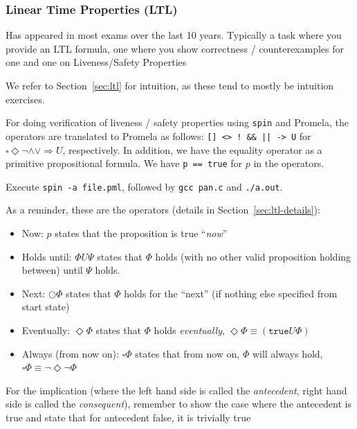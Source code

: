 \newpage
\subsubsection{Linear Time Properties (LTL)}
\begin{examdetails}
    Has appeared in most exams over the last 10 years.
    Typically a task where you provide an LTL formula, one where you show correctness / counterexamples for one and one on Liveness/Safety Properties
\end{examdetails}
We refer to Section~\ref{sec:ltl} for intuition, as these tend to mostly be intuition exercises.

For doing verification of liveness / safety properties using \texttt{spin} and Promela,
the operators are translated to Promela as follows:
\verb+[] <> ! && || -> U+ for $\square \Diamond \neg \land \lor \Rightarrow U$, respectively.
In addition, we have the equality operator as a primitive propositional formula. We have \texttt{p == true} for $p$ in the operators.

Execute \texttt{spin -a file.pml}, followed by \texttt{gcc pan.c} and \texttt{./a.out}.

As a reminder, these are the operators (details in Section~\ref{sec:ltl-details}):
\begin{itemize}
    \item Now: $p$ states that the proposition is true ``\textit{now}''
    \item Holds until: $\Phi U \Psi$ states that $\Phi$ holds (with no other valid proposition holding between) until $\Psi$ holds.
    \item Next: $\bigcirc \Phi$ states that $\Phi$ holds for the ``next'' (if nothing else specified from start state)
    \item Eventually: $\Diamond \Phi$ states that $\Phi$ holds \textit{eventually}, $\Diamond \Phi \equiv (\texttt{true} U \Phi)$
    \item Always (from now on): $\square \Phi$ states that from now on, $\Phi$ will always hold, $\square \Phi \equiv \neg \Diamond \neg \Phi$
\end{itemize}
For the implication (where the left hand side is called the \textit{antecedent}, right hand side is called the \textit{consequent}),
remember to show the case where the antecedent is true and state that for antecedent false, it is trivially true


